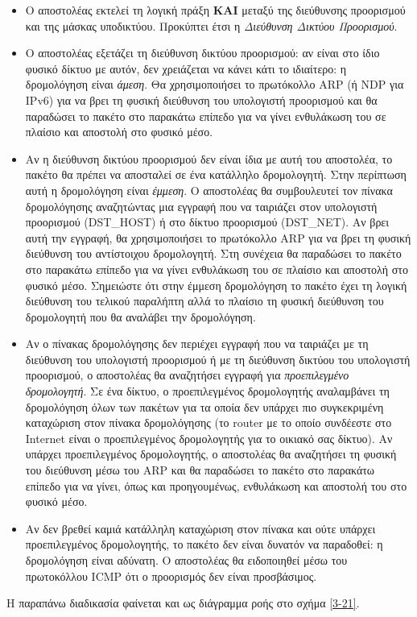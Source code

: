 \begin{itemize}
\item Ο αποστολέας εκτελεί τη λογική πράξη \textbf{ΚΑΙ} μεταξύ της διεύθυνσης προορισμού και της μάσκας υποδικτύου. Προκύπτει έτσι η \emph{Διεύθυνση Δικτύου Προορισμού}.
\item Ο αποστολέας εξετάζει τη διεύθυνση δικτύου προορισμού: αν είναι στο  ίδιο φυσικό δίκτυο με αυτόν, δεν χρειάζεται να κάνει κάτι το ιδιαίτερο: η δρομολόγηση είναι \emph{άμεση}. Θα χρησιμοποιήσει το πρωτόκολλο ARP (ή NDP για IPv6) για να βρει τη φυσική διεύθυνση του υπολογιστή προορισμού και θα παραδώσει το πακέτο στο παρακάτω επίπεδο για να γίνει ενθυλάκωση του σε πλαίσιο και αποστολή στο φυσικό μέσο.
\item Αν η διεύθυνση δικτύου προορισμού δεν είναι ίδια με αυτή του αποστολέα, το πακέτο θα πρέπει να αποσταλεί σε ένα κατάλληλο δρομολογητή. Στην περίπτωση αυτή η δρομολόγηση είναι \emph{έμμεση}. Ο αποστολέας θα συμβουλευτεί τον πίνακα δρομολόγησης αναζητώντας μια εγγραφή που να ταιριάζει στον υπολογιστή προορισμού (DST\_HOST) ή στο δίκτυο προορισμού (DST\_NET). Αν βρει αυτή την εγγραφή, θα χρησιμοποιήσει το πρωτόκολλο ARP για να βρει τη φυσική διεύθυνση του αντίστοιχου δρομολογητή. Στη συνέχεια θα παραδώσει το πακέτο στο παρακάτω επίπεδο για να γίνει ενθυλάκωση του σε πλαίσιο και αποστολή στο φυσικό μέσο. Σημειώστε ότι στην έμμεση δρομολόγηση το πακέτο έχει τη λογική διεύθυνση του τελικού παραλήπτη αλλά το πλαίσιο τη φυσική διεύθυνση του δρομολογητή που θα αναλάβει την δρομολόγηση.
\item Αν ο πίνακας δρομολόγησης δεν περιέχει εγγραφή που να ταιριάζει με τη διεύθυνση του υπολογιστή προορισμού ή με τη διεύθυνση δικτύου του υπολογιστή προορισμού, ο αποστολέας θα αναζητήσει εγγραφή για \emph{προεπιλεγμένο δρομολογητή}. Σε ένα δίκτυο, ο προεπιλεγμένος δρομολογητής αναλαμβάνει τη δρομολόγηση όλων των πακέτων για τα οποία δεν υπάρχει πιο συγκεκριμένη καταχώριση στον πίνακα δρομολόγησης (το router με το οποίο συνδέεστε στο Internet είναι ο προεπιλεγμένος δρομολογητής για το οικιακό σας δίκτυο). Αν υπάρχει προεπιλεγμένος δρομολογητής, ο αποστολέας θα αναζητήσει τη φυσική του διεύθυνση μέσω του ARP και θα παραδώσει το πακέτο στο παρακάτω επίπεδο για να γίνει, όπως και προηγουμένως, ενθυλάκωση και αποστολή του στο φυσικό μέσο.
\item Αν δεν βρεθεί καμιά κατάλληλη καταχώριση στον πίνακα και ούτε υπάρχει προεπιλεγμένος δρομολογητής, το πακέτο δεν είναι δυνατόν να παραδοθεί: η δρομολόγηση είναι αδύνατη. Ο αποστολέας θα ειδοποιηθεί μέσω του πρωτοκόλλου ICMP ότι ο προορισμός δεν είναι προσβάσιμος. 
\end{itemize}

Η παραπάνω διαδικασία φαίνεται και ως διάγραμμα ροής στο σχήμα \ref{3-21}.